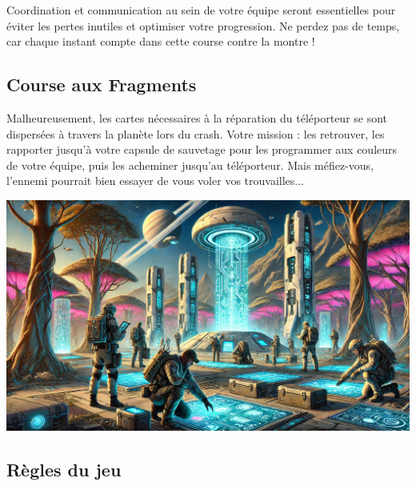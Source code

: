 \documentclass{template}
\begin{document}
Coordination et communication au sein de votre équipe seront essentielles pour éviter les pertes inutiles et optimiser votre progression. Ne perdez pas de temps, car chaque instant compte dans cette course contre la montre !

\subsection{Course aux Fragments}  %

\begin{minipage}[t]{0.48\textwidth}
    Malheureusement, les cartes nécessaires à la réparation du téléporteur se sont dispersées à travers la planète lors du crash. Votre mission : les retrouver, les rapporter jusqu’à votre capsule de sauvetage pour les programmer aux couleurs de votre équipe, puis les acheminer jusqu’au téléporteur. Mais méfiez-vous, l’ennemi pourrait bien essayer de vous voler vos trouvailles...
\end{minipage}
\hfill
\begin{minipage}[t]{0.48\textwidth}
    \vspace{0em}
    \includegraphics[width=\linewidth]{docs/img/variante2.png}
\end{minipage}

\subsection*{Règles du jeu}
\end{document}
